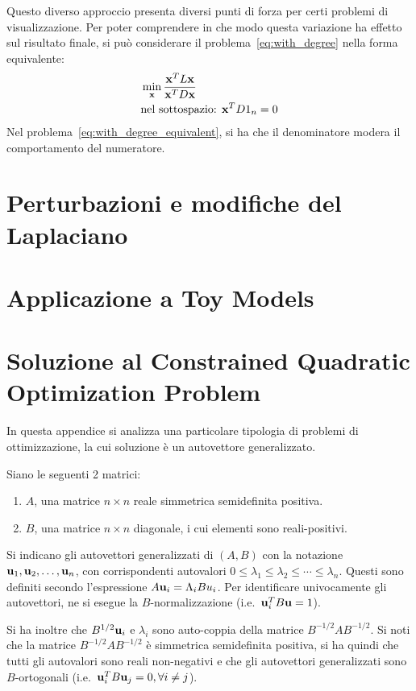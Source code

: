 \documentclass[10pt,a4paper]{article}
\begin{document}
Questo diverso approccio presenta diversi punti di forza per certi problemi di visualizzazione.
Per poter comprendere in che modo questa variazione ha effetto sul risultato finale, si può considerare il problema~\eqref{eq:with_degree} nella forma equivalente:
\begin{align}
    & \min_{\vb{x}} \frac{\vb{x}^T L \vb{x}}{\vb{x}^T D \vb{x}} \label{eq:with_degree_equivalent}\\
    & \text{nel sottospazio: } \vb{x}^T D 1_n = 0\\
\end{align}
Nel problema~\eqref{eq:with_degree_equivalent}, si ha che il denominatore modera il comportamento del numeratore.

\section{Perturbazioni e modifiche del Laplaciano}\label{sec:perturbazioni}

\section{Applicazione a Toy Models}\label{sec:applicazione}

\appendix
\section{Soluzione al Constrained Quadratic Optimization Problem}\label{sec:soluzione_constrained}
In questa appendice si analizza una particolare tipologia di problemi di ottimizzazione, la cui soluzione è un autovettore generalizzato.

Siano le seguenti 2 matrici:
\begin{enumerate}
    \item \(A\), una matrice \(n \times n\) reale simmetrica semidefinita positiva.
    \item \(B\), una matrice \(n \times n\) diagonale, i cui elementi sono reali-positivi.
\end{enumerate}
Si indicano gli autovettori generalizzati di \((A,B)\) con la notazione \(\vb{u}_1,\vb{u}_2,\ldots,\vb{u}_n\), con corrispondenti autovalori \(0\leq\lambda_1\leq\lambda_2\leq\cdots\leq\lambda_n\).
Questi sono definiti secondo l'espressione \(A \vb{u}_i = \Lambda_i B u_i\).
Per identificare univocamente gli autovettori, ne si esegue la \(B\)-normalizzazione (i.e.\  \(\vb{u}_i^T B \vb{u}=1\)).

Si ha inoltre che \(B^{1/2}\vb{u}_i\) e \(\lambda_i\) sono auto-coppia della matrice \(B^{-1/2} A B^{-1/2}\).
Si noti che la matrice \(B^{-1/2} A B^{-1/2}\) è simmetrica semidefinita positiva, si ha quindi che tutti gli autovalori sono reali non-negativi e che gli autovettori generalizzati sono \(B\)-ortogonali (i.e.\  \(\vb{u}_i^T B \vb{u}_j = 0, \forall i \neq j\)).
\end{document}
